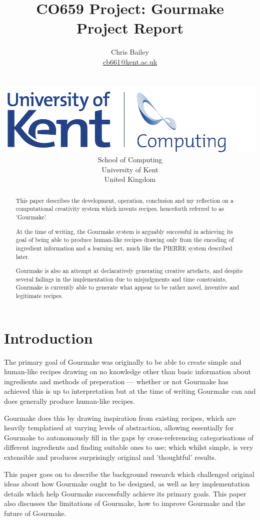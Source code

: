 \documentclass[9pt,titlepage,a4paper]{extarticle}
\title{CO659 Project: Gourmake\\ Project Report}
\author{
	\begin{tabular}{ c c c }
		Chris Bailey\\
		\url{cb661@kent.ac.uk}
	\end{tabular}\\
	\\ \vspace{10mm}
		\includegraphics[scale=0.6]{Kent_Comp_294_RGB} \\
		School of Computing \\
		University of Kent \\
		United Kingdom \\ \vspace{10mm}}
\begin{document}
\maketitle

\begin{abstract}
    This paper describes the development, operation, conclusion and my reflection on a computational
    creativity system which invents recipes, henceforth referred to as 'Gourmake'.

    At the time of writing, the Gourmake system is arguably successful in achieving its goal of being
    able to produce human-like recipes drawing only from the encoding of ingredient information and
    a learning set, much like the PIERRE system described later.

    Gourmake is also an attempt at declaratively generating creative artefacts, and despite several
    failings in the implementation due to misjudgments and time constraints, Gourmake is currently
    able to generate what appear to be rather novel, inventive and legitimate recipes.
\end{abstract}

\section{Introduction}
    The primary goal of Gourmake was originally to be able to create simple and human-like recipes
    drawing on no knowledge other than basic information about ingredients and
    methods of preperation --- whether or not Gourmake has achieved this is up to interpretation but
    at the time of writing Gourmake can and does generally produce human-like recipes.

    Gourmake does this by drawing inspiration from existing recipes, which are heavily templatised at
    varying levels of abstraction, allowing essentially for Gourmake to autonomously fill in the gaps
    by cross-referencing categorisations of different ingredients and finding suitable ones to use; 
    which whilst simple, is very extensible and produces surprisingly original and 'thoughtful' results.

    This paper goes on to describe the background research which challenged original ideas about how Gourmake
    ought to be designed, as well as key implementation details which help Gourmake successfully achieve
    its primary goals. This paper also discusses the limitations of Gourmake, how to improve Gourmake and
    the future of Gourmake.
\end{document}
